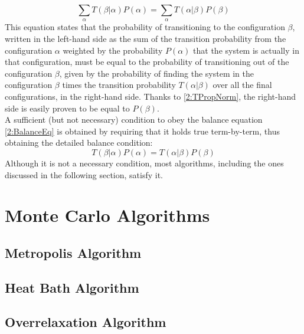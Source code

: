 \begin{equation}
    \sum_\alpha T(\beta|\alpha)P(\alpha) = \sum_\alpha T(\alpha|\beta)P(\beta) \label{2:BalanceEq}
\end{equation}
This equation states that the probability of transitioning to the configuration $\beta$, written in the left-hand side as the sum of the transition probability from the configuration $\alpha$ weighted by the probability $P(\alpha)$ that the system is actually in that configuration, must be equal to the probability of transitioning out of the configuration $\beta$, given by the probability of finding the system in the configuration $\beta$ times the transition probability $T(\alpha|\beta)$ over all the final configurations, in the right-hand side.
Thanks to \eqref{2:TPropNorm}, the right-hand side is easily proven to be equal to $P(\beta)$.\\
A sufficient (but not necessary) condition to obey the balance equation \eqref{2:BalanceEq} is obtained by requiring that it holds true term-by-term, thus obtaining the detailed balance condition:
\begin{equation}
    T(\beta|\alpha)P(\alpha) = T(\alpha|\beta)P(\beta) \label{2:DetailedBalance}
\end{equation}
Although it is not a necessary condition, most algorithms, including the ones discussed in the following section, satisfy it.

\section{Monte Carlo Algorithms}

\subsection{Metropolis Algorithm}

\subsection{Heat Bath Algorithm}

\subsection{Overrelaxation Algorithm}

